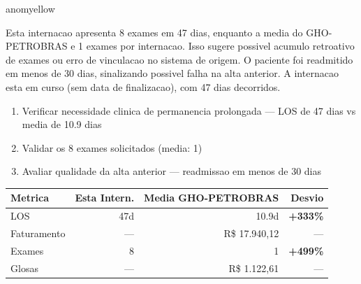 \documentclass[a4paper,10pt]{article}
\begin{document}
\begin{anomalycard}[Internacao 164473 | GHO-PETROBRAS | MODERADO (z=2.53)]{anomyellow}
\vspace{2pt}\begin{tcolorbox}[colback=severityred!20,colframe=anomyellow,title={\textbf{Interpretacao de Negocio}},fonttitle=\bfseries\small,left=4pt,right=4pt,top=3pt,bottom=3pt]
{\small Esta internacao apresenta 8 exames em 47 dias, enquanto a media do GHO-PETROBRAS e 1 exames por internacao. Isso sugere possivel acumulo retroativo de exames ou erro de vinculacao no sistema de origem. O paciente foi readmitido em menos de 30 dias, sinalizando possivel falha na alta anterior. A internacao esta em curso (sem data de finalizacao), com 47 dias decorridos.}
\end{tcolorbox}
\begin{tcolorbox}[colback=severityyellow!30,colframe=anomorange,title={\textbf{Recomendacoes Especificas}},fonttitle=\bfseries\small,left=4pt,right=4pt,top=3pt,bottom=3pt]
\begin{enumerate}[nosep,leftmargin=16pt]
\item {\small Verificar necessidade clinica de permanencia prolongada --- LOS de 47 dias vs media de 10.9 dias}
\item {\small Validar os 8 exames solicitados (media: 1)}
\item {\small Avaliar qualidade da alta anterior --- readmissao em menos de 30 dias}
\end{enumerate}
\end{tcolorbox}
\begin{center}\begin{tabular}{l r r r}\toprule\textbf{Metrica} & \textbf{Esta Intern.} & \textbf{Media GHO-PETROBRAS} & \textbf{Desvio} \\\midrule
LOS & 47d & 10.9d & \textcolor{anomred}{\textbf{+333\%}} \\
Faturamento & --- & R\$ 17.940,12 & --- \\
Exames & 8 & 1 & \textcolor{anomred}{\textbf{+499\%}} \\
Glosas & --- & R\$ 1.122,61 & --- \\
\bottomrule\end{tabular}\end{center}


\end{anomalycard}
\end{document}
